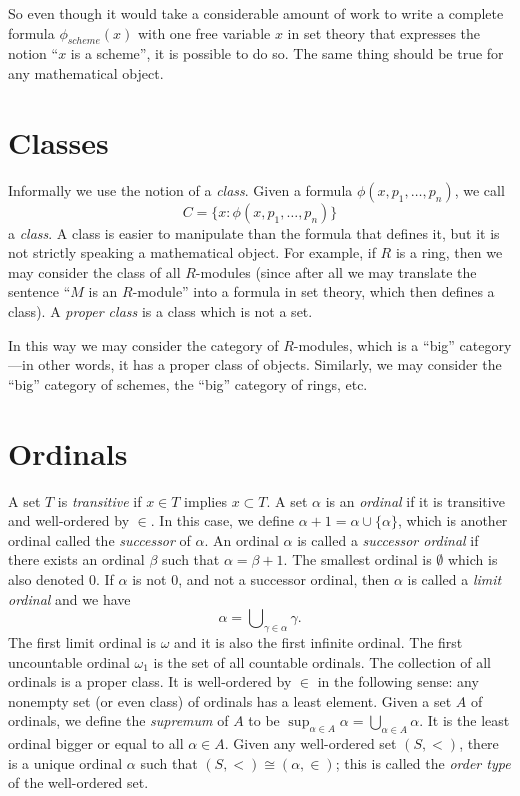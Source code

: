 \medskip\noindent
So even though it would take a considerable amount of work to write
a complete formula $\phi_{scheme}(x)$ with one free variable $x$ in set theory
that expresses the notion ``$x$ is a scheme'', it is possible to do so.
The same thing should be true for any mathematical object.

\section{Classes}
\label{section-classes}

\noindent
Informally we use the notion of a {\it class}. Given a formula
$\phi(x, p_1, \ldots, p_n)$, we call
$$
C = \{x : \phi(x, p_1, \ldots, p_n)\}
$$
a {\it class}. A class is easier to manipulate than the formula
that defines it, but it is not strictly speaking a mathematical
object. For example, if $R$ is a ring, then we may
consider the class of all $R$-modules (since after all we
may translate the sentence ``$M$ is an $R$-module''
into a formula in set theory, which then defines a class).
A {\it proper class} is a class which is not a set.

\medskip\noindent
In this way we may consider the category of $R$-modules,
which is a ``big'' category---in other words, it has a
proper class of objects. Similarly, we may consider
the ``big'' category of schemes, the ``big'' category
of rings, etc.



\section{Ordinals}
\label{section-ordinals}

\noindent
A set $T$ is {\it transitive} if $x\in T$ implies $x\subset T$.
A set $\alpha$ is an {\it ordinal} if it is transitive and well-ordered
by $\in$. In this case, we define $\alpha + 1 = \alpha \cup \{\alpha\}$,
which is another ordinal called the {\it successor} of $\alpha$.
An ordinal $\alpha$ is called a {\it successor ordinal} if
there exists an ordinal $\beta$ such that $\alpha = \beta + 1$.
The smallest ordinal is $\emptyset$ which is also denoted $0$.
If $\alpha$ is not $0$, and not a successor ordinal, then $\alpha$ is called
a {\it limit ordinal} and we have
$$
\alpha
=
\bigcup\nolimits_{\gamma \in \alpha} \gamma.
$$
The first limit ordinal is $\omega$ and it is also the first
infinite ordinal. The first uncountable ordinal $\omega_1$
is the set of all countable ordinals.
The collection of all ordinals is a proper class.
It is well-ordered by $\in$ in the following sense: any nonempty set
(or even class) of ordinals has a least element.
Given a set $A$ of ordinals, we define the {\it supremum}
of $A$ to be $\sup_{\alpha \in A} \alpha =
\bigcup_{\alpha \in A} \alpha$. It is the least ordinal bigger
or equal to all $\alpha \in A$.
Given any well-ordered set $(S, <)$, there is a unique ordinal
$\alpha$ such that $(S, <) \cong (\alpha, \in)$; this is
called the {\it order type} of the well-ordered set.

